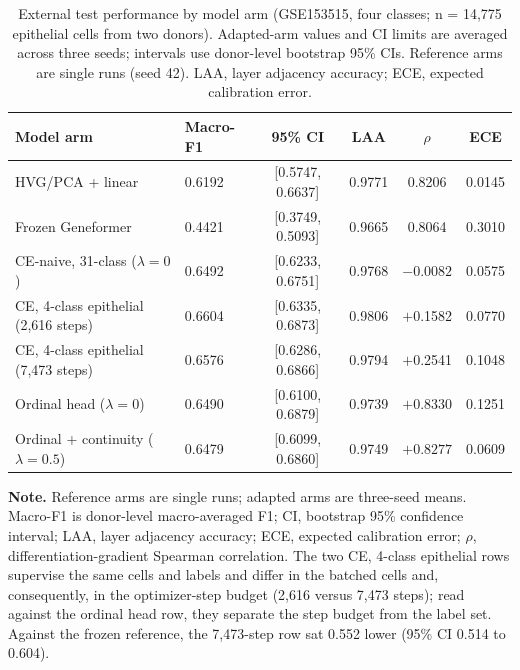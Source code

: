 \documentclass[12pt,letterpaper]{article}
\begin{document}
\begin{table}[htbp]
\centering
\small
\caption{External test performance by model arm (GSE153515, four classes; n = 14{,}775 epithelial cells from two donors). Adapted-arm values and CI limits are averaged across three seeds; intervals use donor-level bootstrap 95\% CIs. Reference arms are single runs (seed 42). LAA, layer adjacency accuracy; ECE, expected calibration error.}\label{tab:external}
\begin{tabularx}{\textwidth}{@{}l X c c c c@{}}
\toprule
Model arm & Macro-F1 & 95\% CI & LAA & $\rho$ & ECE \\
\midrule
HVG/PCA + linear & 0.6192 & [0.5747, 0.6637] & 0.9771 & 0.8206 & 0.0145 \\
Frozen Geneformer & 0.4421 & [0.3749, 0.5093] & 0.9665 & 0.8064 & 0.3010 \\
\addlinespace[4pt]
CE-naive, 31-class ($\lambda=0$) & 0.6492 & [0.6233, 0.6751] & 0.9768 & $-0.0082$ & 0.0575 \\
CE, 4-class epithelial (2{,}616 steps) & 0.6604 & [0.6335, 0.6873] & 0.9806 & $+$0.1582 & 0.0770 \\
CE, 4-class epithelial (7{,}473 steps) & 0.6576 & [0.6286, 0.6866] & 0.9794 & $+$0.2541 & 0.1048 \\
Ordinal head ($\lambda=0$) & 0.6490 & [0.6100, 0.6879] & 0.9739 & $+0.8330$ & 0.1251 \\
Ordinal + continuity ($\lambda=0.5$) & 0.6479 & [0.6099, 0.6860] & 0.9749 & $+0.8277$ & 0.0609 \\
\bottomrule
\end{tabularx}
\bigskip
\footnotesize
\textbf{Note.} Reference arms are single runs; adapted arms are three-seed means. Macro-F1 is donor-level macro-averaged F1; CI, bootstrap 95\% confidence interval; LAA, layer adjacency accuracy; ECE, expected calibration error; $\rho$, differentiation-gradient Spearman correlation. The two CE, 4-class epithelial rows supervise the same cells and labels and differ in the batched cells and, consequently, in the optimizer-step budget (2{,}616 versus 7{,}473 steps); read against the ordinal head row, they separate the step budget from the label set. Against the frozen reference, the 7{,}473-step row sat 0.552 lower (95\% CI 0.514 to 0.604).
\end{table}
\end{document}
